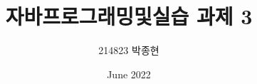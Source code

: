 \documentclass{article}
\title{자바프로그래밍및실습 과제 3}
\author{214823 박종현}
\date{June 2022}
\begin{document}
\maketitle
\pagebreak


\end{document}
